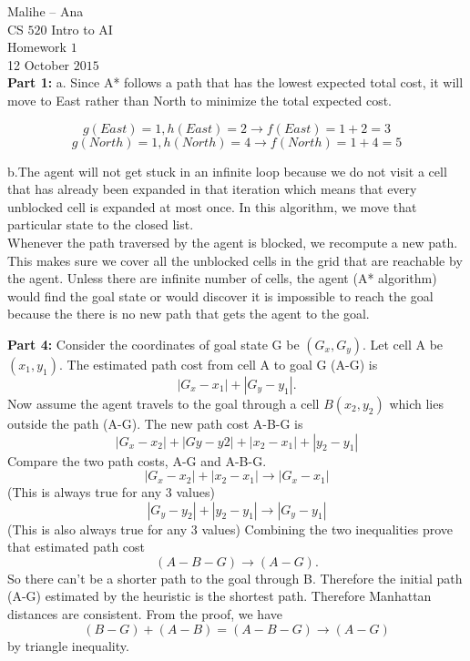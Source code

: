 \documentclass[12pt]{amsart}
\begin{document}
\noindent Malihe -- Ana \\
CS $520$ Intro to AI \\
Homework $1$\\
12 October $2015$\\

\noindent \textbf{Part 1:} a. Since A* follows a path that has the lowest expected total cost, it will move to East rather than North to minimize the total expected cost. 

$$g(East)=1, h(East)=2 \rightarrow f(East)=1+2=3 $$
$$ g(North)=1, h(North)=4 \rightarrow f(North)=1+4=5 $$

b.The agent will not get stuck in an infinite loop because we do not visit a cell that has already been expanded in that iteration which means that every unblocked cell is expanded at most once. In this algorithm, we move that particular state to the closed list.\\
Whenever the path traversed by the agent is blocked, we recompute a new path. This makes sure we cover all the unblocked cells in the grid that are reachable by the agent. Unless there are infinite number of cells, the agent (A* algorithm) would find the goal state or would discover it is impossible to reach the goal because the there is no new path that gets the agent to the goal.

\par
\par

\noindent \textbf{Part  4:} Consider the coordinates of goal state G be $(G_x,G_y)$. Let cell A be $(x_1,y_1)$. The estimated path cost from cell A to goal G (A-G) is $$|G_x-x_1|+|G_y-y_1|.$$ Now assume the agent travels to the goal through a cell $B (x_2,y_2)$ which lies outside the path (A-G). The new path cost A-B-G is $$|G_x- x_2|+|Gy-y2|+|x_2-x_1|+|y_2-y_1|$$
Compare the two path costs, A-G and A-B-G.
\\
$$|G_x-x_2|+|x_2-x_1| \rightarrow  |G_x-x_1|$$(This is always true for any 3 values) $$ |G_y-y_2|+|y_2-y_1|   \rightarrow |G_y-y_1|$$(This is also always true for any 3 values)
Combining the two inequalities prove that estimated path cost $$(A-B-G) \rightarrow (A-G). $$So there can't be a shorter path to the goal through B. Therefore the initial path (A-G) estimated by the heuristic is the shortest path. Therefore Manhattan distances are consistent.
From the proof, we have $$(B-G)+(A-B)=(A-B-G) \rightarrow (A-G)$$  by triangle inequality.


\par
\par
\end{document}
